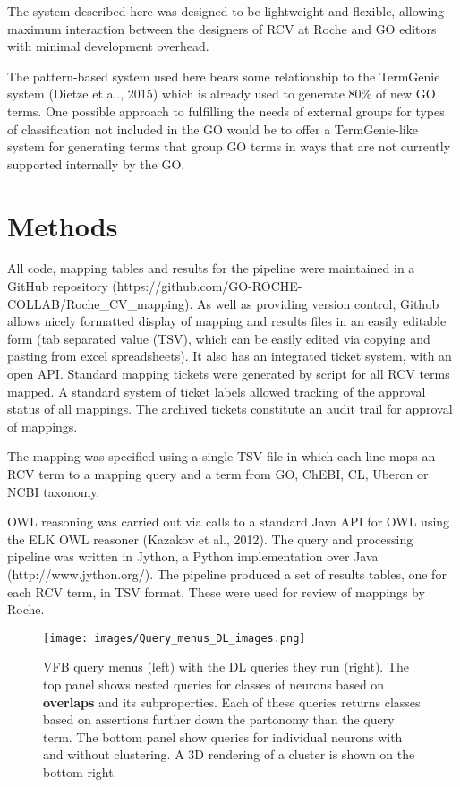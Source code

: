\documentclass[runningheads,a4paper]{llncs}
\begin{document}
{The system described here was designed to be lightweight and flexible, allowing maximum interaction between the designers of RCV at Roche and GO editors with minimal development overhead.

The pattern-based system used here bears some relationship to the TermGenie system (Dietze et al., 2015) which is already used to generate 80\% of new GO terms.  One possible approach to fulfilling the needs of external groups for types of classification not included in the GO would be to offer a TermGenie-like system for generating terms that group GO terms in ways that are not currently supported internally by the GO.


\section{Methods}

All code, mapping tables and results for the pipeline were maintained in a GitHub repository (https://github.com/GO-ROCHE-COLLAB/Roche_CV_mapping). As well as providing version control, Github allows nicely formatted display of mapping and results files in an easily editable form (tab separated value (TSV), which can be easily edited via copying and pasting from excel spreadsheets). It also has an integrated ticket system, with an open API.  Standard mapping tickets were generated by script for all RCV terms mapped. A standard system of ticket labels allowed tracking of the approval status of all mappings.  The archived tickets constitute an audit trail for approval of mappings.

The mapping was specified using a single TSV file in which each line maps an RCV term to a mapping query and a term from GO, ChEBI, CL, Uberon or NCBI taxonomy.

OWL reasoning was carried out via calls to a standard Java API for OWL using the ELK OWL reasoner (Kazakov et al., 2012).  The query and processing pipeline was written in Jython, a Python implementation over Java (http://www.jython.org/).  The pipeline produced a set of results tables, one for each RCV term, in TSV format.  These were used for review of mappings by Roche. 


\begin{figure}
\centering
\texttt{[image: images/Query\_menus\_DL\_images.png]}
\caption{VFB query menus (left) with the DL queries they run (right).  The top panel
  shows nested queries for classes of neurons based on \textbf{overlaps} and its
  subproperties.  Each of these queries returns classes based on
  assertions further down the partonomy than the query term.  The
  bottom panel show queries for individual neurons with and without
  clustering.  A 3D rendering of a cluster is shown on the bottom right. }
\label{fig:Query_menus_DL_images}
\end{figure}



}
\end{document}
